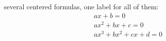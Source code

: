 \documentclass[a4paper,14pt]{article}
\begin{document}
several centered formulas, one label for all of them:
\begin{equation}
\begin{gathered}
a x + b = 0 \\
a x^2 + b x + c = 0 \\
a x^3 + b x^2 + c x + d = 0
\end{gathered}
\end{equation}
\end{document}

